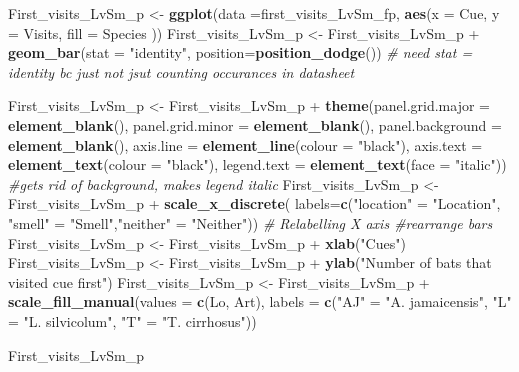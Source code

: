 \documentclass[]{article}
\newenvironment{Shaded}{\begin{snugshade}}{\end{snugshade}}
\newcommand{\KeywordTok}[1]{\textcolor[rgb]{0.13,0.29,0.53}{\textbf{{#1}}}}
\newcommand{\DataTypeTok}[1]{\textcolor[rgb]{0.13,0.29,0.53}{{#1}}}
\newcommand{\StringTok}[1]{\textcolor[rgb]{0.31,0.60,0.02}{{#1}}}
\newcommand{\CommentTok}[1]{\textcolor[rgb]{0.56,0.35,0.01}{\textit{{#1}}}}
\newcommand{\NormalTok}[1]{{#1}}
\begin{document}
\begin{Shaded}
\begin{Highlighting}[]
\NormalTok{First_visits_LvSm_p <-}\StringTok{ }\KeywordTok{ggplot}\NormalTok{(}\DataTypeTok{data =}\NormalTok{first_visits_LvSm_fp, }\KeywordTok{aes}\NormalTok{(}\DataTypeTok{x =} \NormalTok{Cue, }\DataTypeTok{y =} \NormalTok{Visits, }\DataTypeTok{fill =} \NormalTok{Species ))}
\NormalTok{First_visits_LvSm_p <-}\StringTok{ }\NormalTok{First_visits_LvSm_p +}\StringTok{ }\KeywordTok{geom_bar}\NormalTok{(}\DataTypeTok{stat =} \StringTok{"identity"}\NormalTok{, }\DataTypeTok{position=}\KeywordTok{position_dodge}\NormalTok{()) }\CommentTok{# need stat = identity bc just not jsut counting occurances in datasheet}

\NormalTok{First_visits_LvSm_p  <-}\StringTok{ }\NormalTok{First_visits_LvSm_p  +}\StringTok{ }\KeywordTok{theme}\NormalTok{(}\DataTypeTok{panel.grid.major =} \KeywordTok{element_blank}\NormalTok{(), }\DataTypeTok{panel.grid.minor =} \KeywordTok{element_blank}\NormalTok{(),}
\DataTypeTok{panel.background =} \KeywordTok{element_blank}\NormalTok{(), }\DataTypeTok{axis.line =} \KeywordTok{element_line}\NormalTok{(}\DataTypeTok{colour =} \StringTok{"black"}\NormalTok{), }\DataTypeTok{axis.text =} \KeywordTok{element_text}\NormalTok{(}\DataTypeTok{colour =} \StringTok{"black"}\NormalTok{), }\DataTypeTok{legend.text =} \KeywordTok{element_text}\NormalTok{(}\DataTypeTok{face =} \StringTok{"italic"}\NormalTok{))  }\CommentTok{#gets rid of background, makes legend italic}
\NormalTok{First_visits_LvSm_p  <-}\StringTok{ }\NormalTok{First_visits_LvSm_p  +}\StringTok{ }\KeywordTok{scale_x_discrete}\NormalTok{( }\DataTypeTok{labels=}\KeywordTok{c}\NormalTok{(}\StringTok{"location"} \NormalTok{=}\StringTok{ "Location"}\NormalTok{, }\StringTok{"smell"} \NormalTok{=}\StringTok{ "Smell"}\NormalTok{,}\StringTok{"neither"} \NormalTok{=}\StringTok{ "Neither"}\NormalTok{))  }\CommentTok{# Relabelling X axis #rearrange bars}
\NormalTok{First_visits_LvSm_p  <-}\StringTok{ }\NormalTok{First_visits_LvSm_p  +}\StringTok{ }\KeywordTok{xlab}\NormalTok{(}\StringTok{"Cues"}\NormalTok{)}
\NormalTok{First_visits_LvSm_p  <-}\StringTok{ }\NormalTok{First_visits_LvSm_p  +}\StringTok{ }\KeywordTok{ylab}\NormalTok{(}\StringTok{"Number of bats that visited cue first"}\NormalTok{)}
\NormalTok{First_visits_LvSm_p  <-}\StringTok{ }\NormalTok{First_visits_LvSm_p  +}\StringTok{ }\KeywordTok{scale_fill_manual}\NormalTok{(}\DataTypeTok{values =} \KeywordTok{c}\NormalTok{(Lo, Art), }\DataTypeTok{labels =} \KeywordTok{c}\NormalTok{(}\StringTok{"AJ"} \NormalTok{=}\StringTok{ "A. jamaicensis"}\NormalTok{, }\StringTok{"L"} \NormalTok{=}\StringTok{ "L. silvicolum"}\NormalTok{, }\StringTok{"T"} \NormalTok{=}\StringTok{ "T. cirrhosus"}\NormalTok{))}

\NormalTok{First_visits_LvSm_p}
\end{Highlighting}
\end{Shaded}
\end{document}
